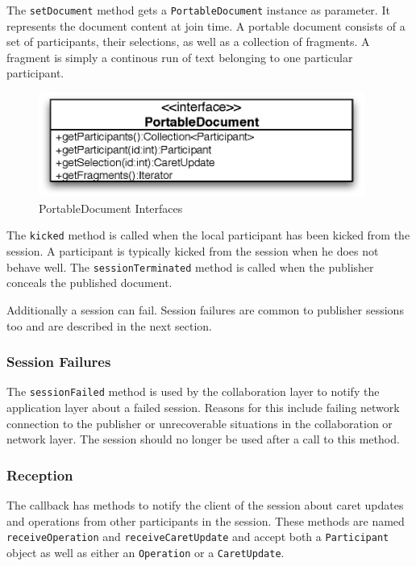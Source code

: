 The \texttt{setDocument} method gets a \texttt{PortableDocument} instance
as parameter. It represents the document content at join time. A portable
document consists of a set of participants, their selections, as well as
a collection of fragments. A fragment is simply a continous run of text
belonging to one particular participant.

\begin{figure}[H]
 \centering
 \includegraphics[width=10.69cm,height=3.42cm]{../images/finalreport/architecture_portabledocument_uml.eps}
 \caption{PortableDocument Interfaces}
\end{figure}

The \texttt{kicked} method is called when the local participant
has been kicked from the session. A participant is typically kicked from
the session when he does not behave well. The \texttt{sessionTerminated}
method is called when the publisher conceals the published document. 

Additionally a session can fail. Session failures are common to publisher
sessions too and are described in the next section.


\subsubsection{Session Failures}
\label{sect:archoverview.sessionfailure}
The \texttt{sessionFailed}
method is used by the collaboration layer to notify the application layer
about a failed session. Reasons for this include failing network connection
to the publisher or unrecoverable situations in the collaboration or network
layer. The session should no longer be used after a call to 
this method.


\subsubsection{Reception}
The callback has methods to notify the client of the session about caret
updates and operations from other participants in the session. These methods
are named \texttt{receiveOperation} and \texttt{receiveCaretUpdate}
and accept both a \texttt{Participant} object
as well as either an \texttt{Operation} or a \texttt{CaretUpdate}.


